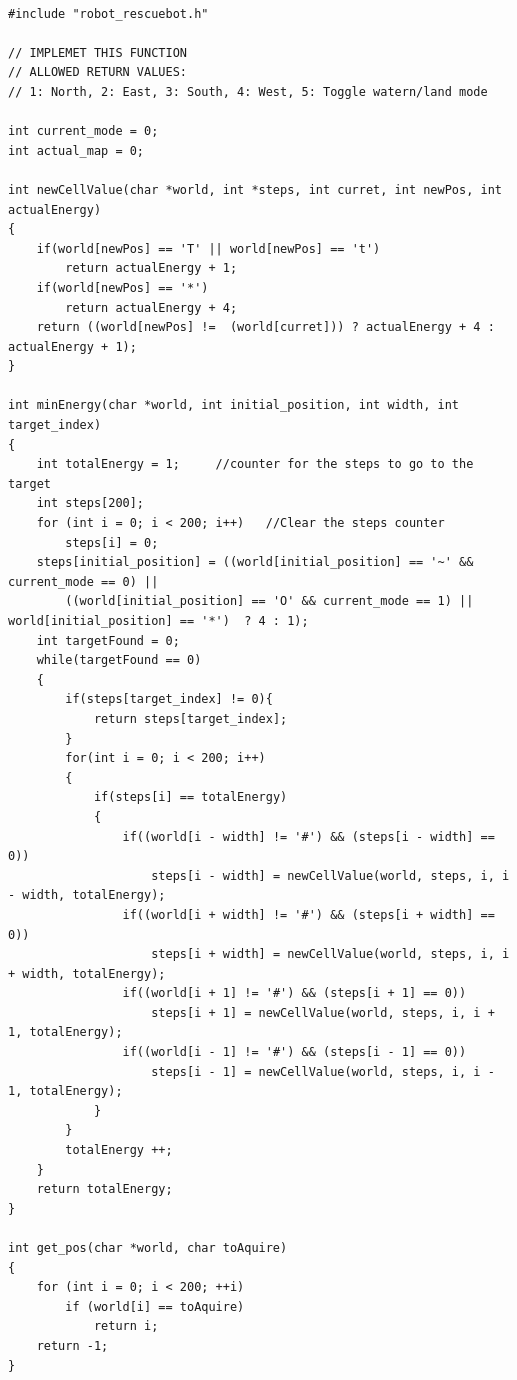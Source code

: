 \documentclass[10pt,journal,compsoc]{IEEEtran}
\begin{document}
\begin{lstlisting}[label = cpp]

#include "robot_rescuebot.h"

// IMPLEMET THIS FUNCTION
// ALLOWED RETURN VALUES:
// 1: North, 2: East, 3: South, 4: West, 5: Toggle watern/land mode

int current_mode = 0;
int actual_map = 0;

int newCellValue(char *world, int *steps, int curret, int newPos, int actualEnergy)
{
    if(world[newPos] == 'T' || world[newPos] == 't')
        return actualEnergy + 1;
    if(world[newPos] == '*')
        return actualEnergy + 4;
    return ((world[newPos] !=  (world[curret])) ? actualEnergy + 4 : actualEnergy + 1);
}

int minEnergy(char *world, int initial_position, int width, int target_index)
{
    int totalEnergy = 1;     //counter for the steps to go to the target
    int steps[200];
    for (int i = 0; i < 200; i++)   //Clear the steps counter
        steps[i] = 0;
    steps[initial_position] = ((world[initial_position] == '~' && current_mode == 0) || 
        ((world[initial_position] == 'O' && current_mode == 1) || world[initial_position] == '*')  ? 4 : 1);
    int targetFound = 0;
    while(targetFound == 0)
    {
        if(steps[target_index] != 0){
            return steps[target_index];
        }
        for(int i = 0; i < 200; i++)
        {
            if(steps[i] == totalEnergy)
            {
                if((world[i - width] != '#') && (steps[i - width] == 0))
                    steps[i - width] = newCellValue(world, steps, i, i - width, totalEnergy);
                if((world[i + width] != '#') && (steps[i + width] == 0))
                    steps[i + width] = newCellValue(world, steps, i, i + width, totalEnergy);    
                if((world[i + 1] != '#') && (steps[i + 1] == 0))
                    steps[i + 1] = newCellValue(world, steps, i, i + 1, totalEnergy);
                if((world[i - 1] != '#') && (steps[i - 1] == 0))
                    steps[i - 1] = newCellValue(world, steps, i, i - 1, totalEnergy);
            }
        }
        totalEnergy ++;
    }
    return totalEnergy;
}

int get_pos(char *world, char toAquire)
{
    for (int i = 0; i < 200; ++i)
        if (world[i] == toAquire)
            return i;
    return -1;
}


\end{lstlisting}
\end{document}
